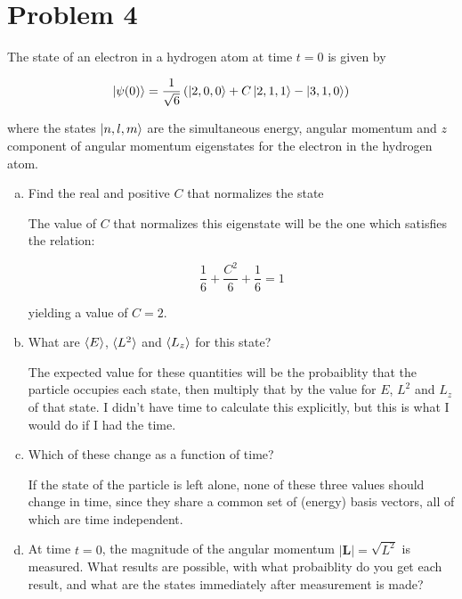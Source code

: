 \documentclass[10pt]{article}
\begin{document}
    \pagebreak

    \section*{Problem 4}

    The state of an electron in a hydrogen atom at time $t = 0$ is given by 

    \[ \ket{\psi(0)} = \frac{1}{\sqrt{6}} \left( \ket{2, 0, 0} + C\ket{2, 1, 1} - \ket{3, 1, 0}\right)\] 

    where the states $\ket{n, l, m}$ are the simultaneous energy, angular momentum and $z$ component of angular momentum eigenstates for the electron in the hydrogen atom. 

    \begin{enumerate}[(a)]
        \item Find the real and positive $C$ that normalizes the state

        \begin{solution}
            The value of $C$ that normalizes this eigenstate will be the one which satisfies the relation: 

            \[ \frac{1}{6} + \frac{C^2}{6} + \frac{1}{6} = 1\] 

            yielding a value of $C = 2$.
        \end{solution}
        \item What are $\langle E \rangle$, $\langle L^2 \rangle$ and $\langle L_z \rangle$ for this state?
        
        \begin{solution}
            The expected value for these quantities will be the probaiblity that the particle occupies each state, then multiply that by the value for $E$, $L^2$ and $L_z$ of that state. I didn't have time to calculate this explicitly, but this is what I would do if I had the time.
        \end{solution}
        \item Which of these change as a function of time? 
        
        \begin{solution}
            If the state of the particle is left alone, none of these three values should change in time, since they share a common set of (energy) basis vectors, all of which are time independent. 
        \end{solution}
        \item At time $t = 0$, the magnitude of the angular momentum $|\mathbf L| = \sqrt{L^2}$ is measured. What results are possible, with what probaiblity do you get each result, and what are the states immediately after measurement is made? 
        

\end{enumerate}
\end{document}
